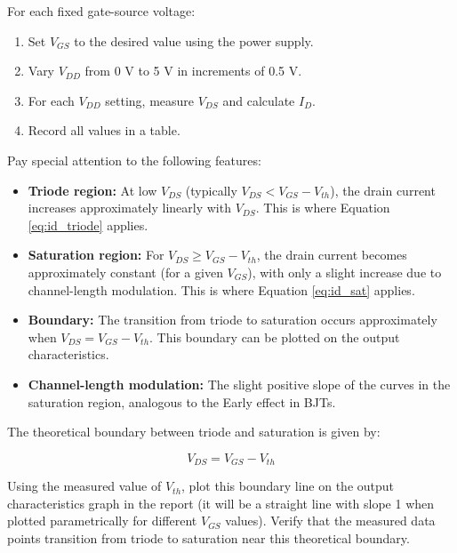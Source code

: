 \documentclass[10pt]{article}
\begin{document}
For each fixed gate-source voltage: 

\begin{enumerate}
    \item Set $V_{GS}$ to the desired value using the power supply. 
    
    \item Vary $V_{DD}$ from 0 V to 5 V in increments of 0.5 V.
    
    \item For each $V_{DD}$ setting, measure $V_{DS}$ and calculate $I_D$. 
    
    \item Record all values in a table.
\end{enumerate}

Pay special attention to the following features: 

\begin{itemize}
    \item \textbf{Triode region: } At low $V_{DS}$ (typically $V_{DS} < V_{GS} - V_{th}$), the drain current increases approximately linearly with $V_{DS}$. This is where Equation \ref{eq:id_triode} applies.
    
    \item \textbf{Saturation region:} For $V_{DS} \geq V_{GS} - V_{th}$, the drain current becomes approximately constant (for a given $V_{GS}$), with only a slight increase due to channel-length modulation. This is where Equation \ref{eq:id_sat} applies.
    
    \item \textbf{Boundary: } The transition from triode to saturation occurs approximately when $V_{DS} = V_{GS} - V_{th}$. This boundary can be plotted on the output characteristics. 
    
    \item \textbf{Channel-length modulation:} The slight positive slope of the curves in the saturation region, analogous to the Early effect in BJTs. 
\end{itemize}

\vspace{.5in}
The theoretical boundary between triode and saturation is given by:

\begin{equation}
    V_{DS} = V_{GS} - V_{th}
\end{equation}

Using the measured value of $V_{th}$, plot this boundary line on the output characteristics graph in the report (it will be a straight line with slope 1 when plotted parametrically for different $V_{GS}$ values). Verify that the measured data points transition from triode to saturation near this theoretical boundary. \\
\end{document}
